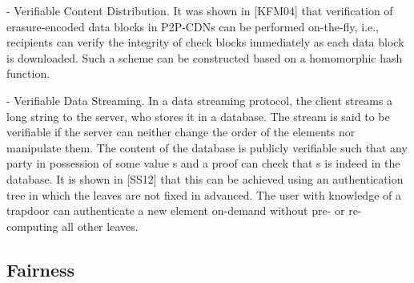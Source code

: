 - Verifiable Content Distribution. It was shown in [KFM04] that verification of erasure-encoded data blocks in P2P-CDNs can be performed on-the-fly, i.e., recipients can verify the integrity of check blocks immediately as each data block is downloaded. Such a scheme can be constructed based on a homomorphic hash function.

- Verifiable Data Streaming. In a data streaming protocol, the client streams a long string to the server, who stores it in a database. The stream is said to be verifiable if the server can neither change the order of the elements nor manipulate them. The content of the database is publicly verifiable such that any party in possession of some value s and a proof can check that s is indeed in the database. It is shown in [SS12] that this can be achieved using an authentication tree in which the leaves are not fixed in advanced. The user with knowledge of a trapdoor can authenticate a new element on-demand without pre- or re-computing all other leaves.


\subsection{Fairness}
